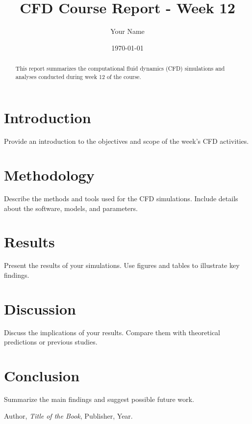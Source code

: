 \documentclass{article}
\title{CFD Course Report - Week 12}
\author{Your Name}
\date{\today}
\begin{document}
\maketitle

\begin{abstract}
This report summarizes the computational fluid dynamics (CFD) simulations and analyses conducted during week 12 of the course.
\end{abstract}

\section{Introduction}
Provide an introduction to the objectives and scope of the week's CFD activities.

\section{Methodology}
Describe the methods and tools used for the CFD simulations. Include details about the software, models, and parameters.

\section{Results}
Present the results of your simulations. Use figures and tables to illustrate key findings.

\section{Discussion}
Discuss the implications of your results. Compare them with theoretical predictions or previous studies.

\section{Conclusion}
Summarize the main findings and suggest possible future work.

\begin{thebibliography}{9}
Author, \textit{Title of the Book}, Publisher, Year.
\end{thebibliography}
\end{document}
